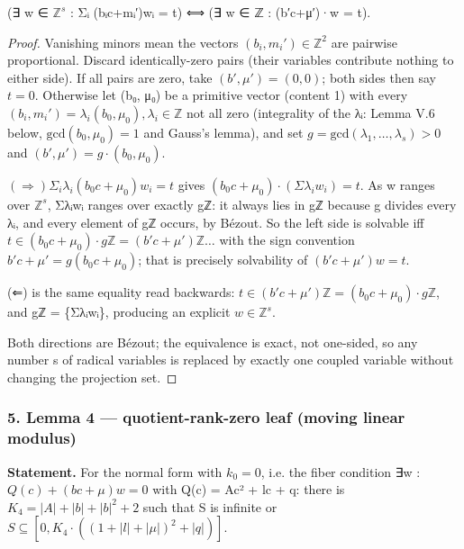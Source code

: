 \documentclass[11pt]{article}
\theoremstyle{plain}
\theoremstyle{definition}
\theoremstyle{remark}
\theoremstyle{plain}
\theoremstyle{definition}
\theoremstyle{remark}
\theoremstyle{plain}
\theoremstyle{definition}
\theoremstyle{remark}
\begin{document}
(∃ w ∈ $ℤ^{s}$ : Σᵢ (bᵢc+mᵢ′)wᵢ = t)  ⟺  (∃ w ∈ ℤ : (b′c+μ′)·w = t).

\begin{proof}
Vanishing minors mean the vectors $(b_{i}, m_{i}′) ∈ ℤ^{2}$ are pairwise proportional. Discard identically-zero pairs (their variables contribute nothing to either side). If all pairs are zero, take $(b′, μ′) = (0,0)$; both sides then say $t = 0$. Otherwise let (b₀, μ₀) be a primitive vector (content 1) with every $(b_{i}, m_{i}′) = λ_{i}(b_{0}, μ_{0}), λ_{i} ∈ ℤ$ not all zero (integrality of the λᵢ: Lemma V.6 below, $\mathrm{gcd}(b_{0},μ_{0}) = 1$ and Gauss's lemma), and set $g = \mathrm{gcd}(λ_{1},…,λ_{s}) > 0$ and $(b′, μ′) = g·(b_{0}, μ_{0})$.

$(⇒) Σ_{i} λ_{i}(b_{0}c+μ_{0})w_{i} = t$ gives $(b_{0}c+μ_{0})·(Σλ_{i}w_{i}) = t$. As w ranges over $ℤ^{s}$, Σλᵢwᵢ ranges over exactly gℤ: it always lies in gℤ because g divides every λᵢ, and every element of gℤ occurs, by Bézout. So the left side is solvable iff $t ∈ (b_{0}c+μ_{0})·gℤ = (b′c+μ′)ℤ…$ with the sign convention $b′c+μ′ = g(b_{0}c+μ_{0})$; that is precisely solvability of $(b′c+μ′)w = t$.

(⇐) is the same equality read backwards: $t ∈ (b′c+μ′)ℤ = (b_{0}c+μ_{0})·gℤ$, and gℤ = \{Σλᵢwᵢ\}, producing an explicit $w ∈ ℤ^{s}$.

Both directions are Bézout; the equivalence is exact, not one-sided, so any number s of radical variables is replaced by exactly one coupled variable without changing the projection set.

\end{proof}
\subsubsection*{5. Lemma 4 — quotient-rank-zero leaf (moving linear modulus)}
\textbf{Statement.} For the normal form with $k_{0} = 0$, i.e. the fiber condition ∃w : $Q(c) + (bc+μ)w = 0$ with Q(c) = Ac² + lc + q: there is $K_{4} = |A| + |b| + |b|^{2} + 2$ such that S is infinite or $S ⊆ [0, K_{4}·((1+|l|+|μ|)^{2}+|q|)]$.
\end{document}
